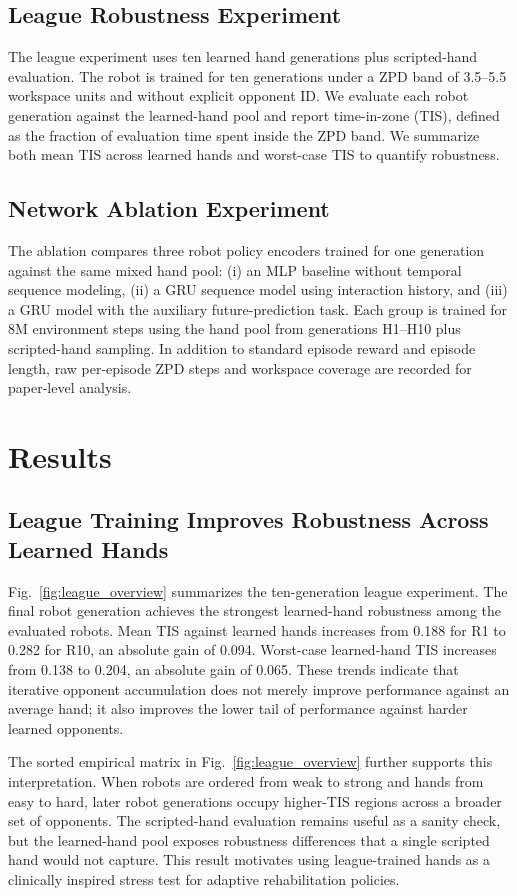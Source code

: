 \documentclass[lettersize,journal]{IEEEtran}
\begin{document}
\subsection{League Robustness Experiment}
The league experiment uses ten learned hand generations plus scripted-hand evaluation. The robot is trained for ten generations under a ZPD band of 3.5--5.5 workspace units and without explicit opponent ID. We evaluate each robot generation against the learned-hand pool and report time-in-zone (TIS), defined as the fraction of evaluation time spent inside the ZPD band. We summarize both mean TIS across learned hands and worst-case TIS to quantify robustness.

\subsection{Network Ablation Experiment}
The ablation compares three robot policy encoders trained for one generation against the same mixed hand pool: (i) an MLP baseline without temporal sequence modeling, (ii) a GRU sequence model using interaction history, and (iii) a GRU model with the auxiliary future-prediction task. Each group is trained for 8M environment steps using the hand pool from generations H1--H10 plus scripted-hand sampling. In addition to standard episode reward and episode length, raw per-episode ZPD steps and workspace coverage are recorded for paper-level analysis.

\section{Results}
\subsection{League Training Improves Robustness Across Learned Hands}
Fig.~\ref{fig:league_overview} summarizes the ten-generation league experiment. The final robot generation achieves the strongest learned-hand robustness among the evaluated robots. Mean TIS against learned hands increases from 0.188 for R1 to 0.282 for R10, an absolute gain of 0.094. Worst-case learned-hand TIS increases from 0.138 to 0.204, an absolute gain of 0.065. These trends indicate that iterative opponent accumulation does not merely improve performance against an average hand; it also improves the lower tail of performance against harder learned opponents.

The sorted empirical matrix in Fig.~\ref{fig:league_overview} further supports this interpretation. When robots are ordered from weak to strong and hands from easy to hard, later robot generations occupy higher-TIS regions across a broader set of opponents. The scripted-hand evaluation remains useful as a sanity check, but the learned-hand pool exposes robustness differences that a single scripted hand would not capture. This result motivates using league-trained hands as a clinically inspired stress test for adaptive rehabilitation policies.
\end{document}

